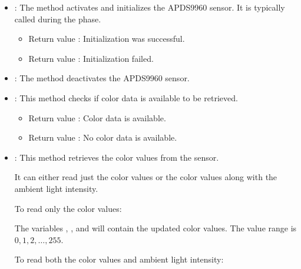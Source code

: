 \begin{itemize}
	\item {}: The  method activates and initializes the APDS9960 sensor. It is typically called during the  phase.
	
	\medskip
	
	\begin{itemize}
		\item Return value : Initialization was successful.
		\item Return value : Initialization failed.
	\end{itemize}
	
	\item {}: The  method deactivates the APDS9960 sensor.
	
	
	\item {}: This method checks if color data is available to be retrieved.
	
	\medskip
	
	\begin{itemize}
		\item Return value : Color data is available.
		\item Return value : No color data is available.
	\end{itemize}
	
	\item {}: This method retrieves the color values from the sensor.
	
	It can either read just the color values or the color values along with the ambient light intensity.
	
	\medskip
	
	To read only the color values:
	
	
	
	\medskip
	
	The variables , , and  will contain the updated color values. The value range is $0, 1, 2, \ldots, 255$.
	
	\medskip
	
	To read both the color values and ambient light intensity:
	
	
	
	\medskip
	

\end{itemize}
